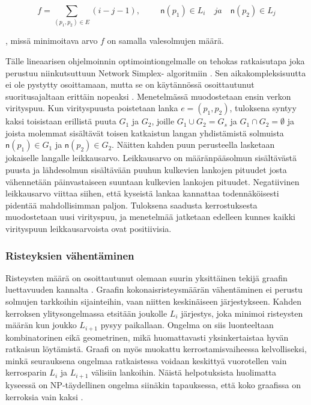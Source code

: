 \documentclass[finnish,12pt]{article}
\begin{document}
\begin{equation}
f=\displaystyle\sum\limits_{(p_1 ,p_2) \in E} (i - j - 1), \hspace{1cm}
\mathsf{n}(p_1) \in L_i \quad ja \quad \mathsf{n}(p_2) \in L_j
\end{equation}

, missä minimoitava arvo $f$ on samalla valesolmujen määrä.

Tälle lineaarisen ohjelmoinnin optimointiongelmalle on tehokas ratkaisutapa joka perustuu niinkutsuttuun Network Simplex- algoritmiin \cite{RefWorks:71}.
Sen aikakompleksisuutta ei ole pystytty osoittamaan, mutta se on käytännössä osoittautunut suoritusajaltaan erittäin nopeaksi  \cite{RefWorks:28}.
Menetelmässä muodostetaan ensin verkon virityspuu.
Kun virityspuusta poistetaan lanka $e=(p_1, p_2)$, tuloksena syntyy kaksi toisistaan erillistä puuta $G_1$ ja $G_2$, joille $G_1 \cup G_2 = G_s$ ja $G_1 \cap G_2 = \emptyset$ ja joista molemmat sisältävät toisen katkaistun langan yhdistämistä solmuista $\mathsf{n}(p_1) \in G_1$ ja $\mathsf{n}(p_2) \in G_2$.
Näitten kahden puun perusteella lasketaan jokaiselle langalle leikkausarvo.
Leikkausarvo on määränpääsolmun sisältävästä puusta ja lähdesolmun sisältävään puuhun kulkevien lankojen pituudet
josta vähennetään päinvastaiseen suuntaan kulkevien lankojen pituudet.
Negatiivinen leikkausarvo viittaa siihen, että kyseistä lankaa kannattaa todennäköisesti pidentää mahdollisimman paljon.
Tuloksena saadusta kerrostuksesta muodostetaan uusi virityspuu, ja menetelmää jatketaan edelleen kunnes kaikki virityspuun leikkausarvoista ovat positiivisia.


		\subsubsection{Risteyksien vähentäminen}

Risteysten määrä on osoittautunut olemaan suurin yksittäinen tekijä graafin luettavuuden kannalta \cite{RefWorks:47}. 
Graafin kokonaisristeysmäärän vähentäminen ei perustu solmujen tarkkoihin sijainteihin, vaan niitten keskinäiseen järjestykseen.
Kahden kerroksen ylitysongelmassa etsitään joukolle $L_i$ järjestys, joka minimoi risteysten määrän kun joukko $L_{i+1}$ pysyy paikallaan.
Ongelma on siis luonteeltaan kombinatorinen eikä geometrinen, mikä huomattavasti yksinkertaistaa hyvän ratkaisun löytämistä.
Graafi on myös muokattu kerrostamisvaiheessa kelvolliseksi, minkä seurauksena ongelmaa ratkaistessa voidaan keskittyä vuorotellen vain kerrosparin $L_i$ ja $L_{i+1}$ välisiin lankoihin.
Näistä helpotuksista huolimatta kyseessä on NP-täydellinen ongelma siinäkin tapauksessa, että koko graafissa on kerroksia vain kaksi \cite{RefWorks:40}.
\end{document}
